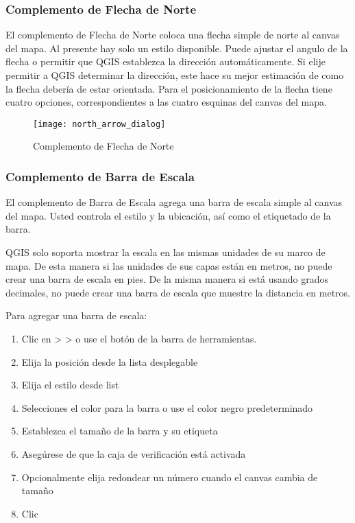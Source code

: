 \subsubsection{Complemento de Flecha de Norte}

El complemento de Flecha de Norte coloca una flecha simple de norte al canvas del mapa. Al
presente hay solo un estilo disponible. Puede ajustar el angulo de la flecha
o permitir que QGIS establezca la dirección automáticamente. Si elije permitir a
QGIS determinar la dirección, este hace su mejor estimación de como la flecha debería de
estar orientada. Para el posicionamiento de la flecha tiene cuatro opciones, 
correspondientes a las cuatro esquinas del canvas del mapa.

\begin{figure}[ht]
   \begin{center}
   \caption{Complemento de Flecha de Norte \nixcaption}\label{fig:north_arrow}\smallskip
   \texttt{[image: north\_arrow\_dialog]}
\end{center}  
\end{figure}

\subsubsection{Complemento de Barra de Escala}
El complemento de Barra de Escala agrega una barra de escala simple al canvas del mapa. Usted controla
el estilo y la ubicación, así como el etiquetado de la barra. 

QGIS solo soporta mostrar la escala en las mismas unidades de su marco de mapa. De esta manera
si las unidades de sus capas están en metros, no puede crear una barra de escala en
pies. De la misma manera si está usando grados decimales, no puede crear una barra de escala
que muestre la distancia en metros.

Para agregar una barra de escala:

\begin{enumerate}
\item Clic en  >  >  o use el botón  de la barra de herramientas.
\item Elija la posición desde la lista desplegable 
\item Elija el estilo desde   list
\item Selecciones el color para la barra  o use el color negro predeterminado
\item Establezca el tamaño de la barra y su etiqueta 
\item Asegúrese de que la caja de verificación  está activada
\item Opcionalmente elija redondear un número cuando el canvas cambia de tamaño 
\item Clic  
\end{enumerate} 

